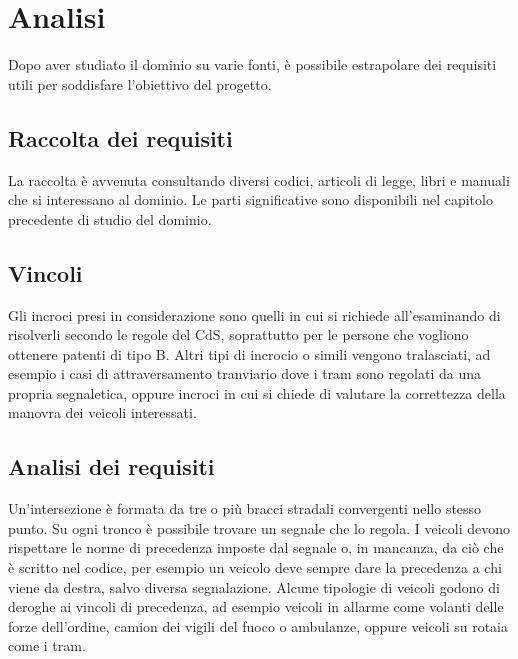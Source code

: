 \chapter{Analisi}

Dopo aver studiato il dominio su varie fonti, è possibile estrapolare dei requisiti utili per soddisfare l'obiettivo del progetto.

\section{Raccolta dei requisiti}
La raccolta è avvenuta consultando diversi codici, articoli di legge, libri e manuali che si interessano al dominio. Le parti significative sono disponibili nel capitolo precedente di studio del dominio.

\section{Vincoli}
Gli incroci presi in considerazione sono quelli in cui si richiede all'esaminando di risolverli secondo le regole del CdS, soprattutto per le persone che vogliono ottenere patenti di tipo B. Altri tipi di incrocio o simili vengono tralasciati, ad esempio i casi di attraversamento tranviario dove i tram sono regolati da una propria segnaletica, oppure incroci in cui si chiede di valutare la correttezza della manovra dei veicoli interessati.

\section{Analisi dei requisiti}
Un'intersezione è formata da tre o più bracci stradali convergenti nello stesso punto. Su ogni tronco è possibile trovare un segnale che lo regola. I veicoli devono rispettare le norme di precedenza imposte dal segnale o, in mancanza, da ciò che è scritto nel codice, per esempio un veicolo deve sempre dare la precedenza a chi viene da destra, salvo diversa segnalazione. Alcune tipologie di veicoli godono di deroghe ai vincoli di precedenza, ad esempio veicoli in allarme come volanti delle forze dell'ordine, camion dei vigili del fuoco o ambulanze, oppure veicoli su rotaia come i tram.

